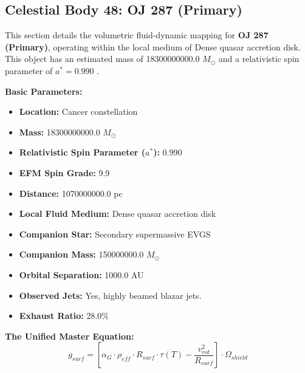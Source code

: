 \documentclass[11pt, a4paper]{article}
\begin{document}
\clearpage
\subsection{Celestial Body 48: OJ 287 (Primary)}
This section details the volumetric fluid-dynamic mapping for \textbf{OJ 287 (Primary)}, operating within the local medium of Dense quasar accretion disk. This object has an estimated mass of 18300000000.0 $M_{\odot}$ and a relativistic spin parameter of $a^* = 0.990$ \cite{valtonen2008, ned}.

\vspace{0.5em}
\noindent \textbf{Basic Parameters:}
\begin{itemize}
  \item \textbf{Location:} Cancer constellation
  \item \textbf{Mass:} 18300000000.0 $M_{\odot}$
  \item \textbf{Relativistic Spin Parameter ($a^*$):} 0.990
  \item \textbf{EFM Spin Grade:} 9.9
  \item \textbf{Distance:} 1070000000.0 pc
  \item \textbf{Local Fluid Medium:} Dense quasar accretion disk
  \item \textbf{Companion Star:} Secondary supermassive EVGS
  \item \textbf{Companion Mass:} 150000000.0 $M_{\odot}$
  \item \textbf{Orbital Separation:} 1000.0 AU
  \item \textbf{Observed Jets:} Yes, highly beamed blazar jets.
  \item \textbf{Exhaust Ratio:} 28.0\%
\end{itemize}

\vspace{0.5em}
\noindent \textbf{The Unified Master Equation:}
$$ g_{surf} = \left[ \alpha_G \cdot \rho_{eff} \cdot R_{surf} \cdot \tau(T) - \frac{v_{rot}^2}{R_{surf}} \right] \cdot \Omega_{shield} $$
\end{document}

